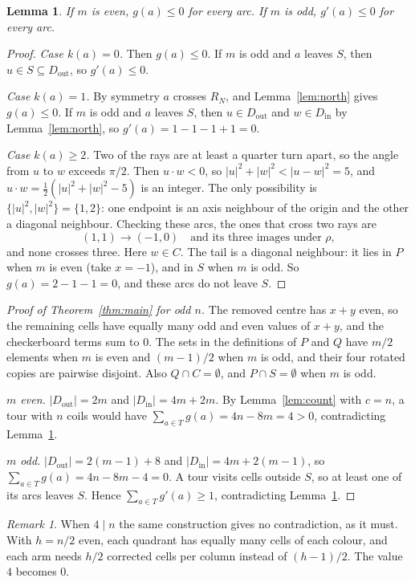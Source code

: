 \documentclass[11pt]{amsart}
\newtheorem{lemma}[theorem]{Lemma}
\theoremstyle{remark}
\newtheorem{remark}[theorem]{Remark}
\newcommand{\Dout}{D_{\mathrm{out}}}
\newcommand{\Din}{D_{\mathrm{in}}}
\begin{document}
\begin{lemma}\label{lem:odd}
If $m$ is even, $g(a)\le0$ for every arc. If $m$ is odd, $g'(a)\le0$ for every arc.
\end{lemma}
\begin{proof}
\emph{Case $k(a)=0$.} Then $g(a)\le0$. If $m$ is odd and $a$ leaves $S$, then $u\in S\subseteq\Dout$, so $g'(a)\le0$.

\emph{Case $k(a)=1$.} By symmetry $a$ crosses $R_N$, and Lemma~\ref{lem:north} gives $g(a)\le0$. If $m$ is odd and $a$
leaves $S$, then $u\in\Dout$ and $w\in\Din$ by Lemma~\ref{lem:north}, so $g'(a)=1-1-1+1=0$.

\emph{Case $k(a)\ge2$.} Two of the rays are at least a quarter turn apart, so the angle from $u$ to $w$ exceeds
$\pi/2$. Then $u\cdot w<0$, so $|u|^2+|w|^2<|u-w|^2=5$, and $u\cdot w=\frac12(|u|^2+|w|^2-5)$ is an integer. The only
possibility is $\{|u|^2,|w|^2\}=\{1,2\}$: one endpoint is an axis neighbour of the origin and the other a diagonal
neighbour. Checking these arcs, the ones that cross two rays are
\[ (1,1)\to(-1,0)\quad\text{and its three images under }\rho, \]
and none crosses three. Here $w\in C$. The tail is a diagonal neighbour: it lies in $P$ when $m$ is even (take
$x=-1$), and in $S$ when $m$ is odd. So $g(a)=2-1-1=0$, and these arcs do not leave $S$.
\end{proof}

\begin{proof}[Proof of Theorem~\ref{thm:main} for odd $n$]
The removed centre has $x+y$ even, so the remaining cells have equally many odd and even values of $x+y$, and the
checkerboard terms sum to $0$. The sets in the definitions of $P$ and $Q$ have $m/2$ elements when $m$ is even and
$(m-1)/2$ when $m$ is odd, and their four rotated copies are pairwise disjoint. Also $Q\cap C=\emptyset$, and
$P\cap S=\emptyset$ when $m$ is odd.

\emph{$m$ even.} $|\Dout|=2m$ and $|\Din|=4m+2m$. By Lemma~\ref{lem:count} with $c=n$, a tour with $n$ coils would have
$\sum_{a\in T}g(a)=4n-8m=4>0$, contradicting Lemma~\ref{lem:odd}.

\emph{$m$ odd.} $|\Dout|=2(m-1)+8$ and $|\Din|=4m+2(m-1)$, so $\sum_{a\in T}g(a)=4n-8m-4=0$. A tour visits cells
outside $S$, so at least one of its arcs leaves $S$. Hence $\sum_{a\in T}g'(a)\ge1$, contradicting
Lemma~\ref{lem:odd}.
\end{proof}

\begin{remark}
When $4\mid n$ the same construction gives no contradiction, as it must. With $h=n/2$ even, each quadrant has
equally many cells of each colour, and each arm needs $h/2$ corrected cells per column instead of $(h-1)/2$. The
value $4$ becomes $0$.
\end{remark}
\end{document}
